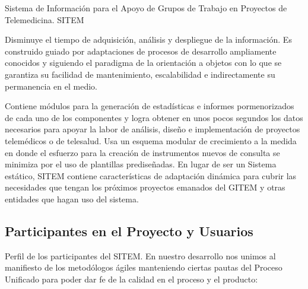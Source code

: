 \begin{itemize}
Sistema de Información para el Apoyo de Grupos de Trabajo en Proyectos de Telemedicina. SITEM

Disminuye el tiempo de adquisición, análisis y despliegue de la información. Es construido guiado por adaptaciones de procesos de desarrollo ampliamente conocidos y siguiendo el paradigma de la orientación a objetos con lo que se garantiza su facilidad de mantenimiento, escalabilidad e indirectamente su permanencia en el medio.

Contiene módulos para la generación de estadísticas e informes pormenorizados de cada uno de los componentes y logra obtener en unos pocos segundos los datos necesarios para apoyar la labor de análisis, diseño e implementación de proyectos telemédicos o de telesalud. Usa un esquema modular de crecimiento a la medida en donde el esfuerzo para la creación de instrumentos nuevos de consulta se minimiza por el uso de plantillas prediseñadas. En lugar de ser un Sistema estático, SITEM contiene características de adaptación dinámica para cubrir las necesidades que tengan los próximos proyectos emanados del GITEM y otras entidades que hagan uso del sistema.
\end{itemize}

\subsection{Participantes en el Proyecto y Usuarios}

Perfil de los participantes del SITEM. En nuestro desarrollo nos unimos al manifiesto de los metodólogos ágiles manteniendo ciertas pautas del Proceso Unificado para poder dar fe de la calidad en el proceso y el producto:

